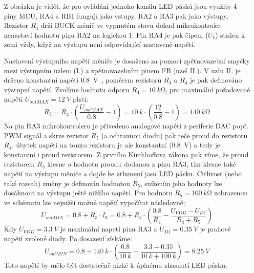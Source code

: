     Z obrázku je vidět, že pro ovládání jednoho kanálu LED pásků jsou využity 4 piny MCU, RA4 a RB1 fungují jako vstupy, RA2 a RA3 pak jako výstupy. Rezistor \(R_{1}\) drží BUCK měnič ve vypnutém stavu dokud mikrokontroler nenastaví hodnotu pinu RA2 na logickou 1. Pin RA4 je pak čipem (\(U_{1} \)) stažen k zemi vždy, když na výstupu není odpovídající nastavené napětí.  
    
    Nastavení výstupního napětí měniče je dosaženo za pomoci zpětnovazební smyčky mezi výstupním uzlem (I.) a zpětnovazebním pinem FB (uzel II.). V uzlu II. je drženo konstantní napětí \qty{0.8}{V}~\cite{Diodes_AP63356Q}, poměrem rezistorů \(R_{3} \) a \(R_{4} \) je pak definováno výstupní napětí. Zvolíme hodnotu odporu \(R_{4} = \qty{10}{k\ohm}\), pro maximální požadované napětí \(U_{outMAX} = \qty{12}{V}\) platí:
    \begin{equation}
        R_{3} = R_{4}\cdot \left(\frac{U_{outMAX} }{\num{0.8}}-1\right) = \qty{10}{k}\cdot \left(\frac{12}{\num{0.8}}-1\right) = \qty{140}{k\ohm}
    \end{equation} 
    Na pin RA3 mikrokontroleru je přivedeno analogové napětí z periferie DAC popř. PWM signál a skrze rezistor \(R_{5} \) (a ochrannou diodu) pak teče proud do rezistoru \(R_{4} \), úbytek napětí na tomto rezistoru je ale konstantní (\qty{0.8}{V}) a tedy je konstantní i proud rezistorem. Z prvního Kirchhoffova zákona pak víme, že proud rezistorem \(R_{3} \) klesne o hodnotu proudu dodanou z pinu RA3, tím klesne také napětí na výstupu měniče a dojde ke ztlumení jasu LED pásku. Citlivost (nebo také rozsah) změny je definován hodnotou \(R_{5} \), snížením jeho hodnoty lze dosáhnout na výstupu ještě nižšího napětí. Pro hodnotu \(R_{5} = \qty{100}{k\ohm}\) zobrazenou ve schématu lze nejnižší možné napětí vypočítat následovně:
    \begin{equation}
        U_{outMIN} = \num{0.8}+R_{3} \cdot I_{3} = \num{0.8}+R_{3} \cdot \left(\frac{\num{0.8}}{R_{4}} - \frac{U_{VDD} - U_{D1}}{R_{4}+R_{5}} \right) 
    \end{equation}  
    Kdy \(U_{VDD} = \qty{3.3}{V}\) je maximální napetí pinu RA3 a \(U_{D1}=\qty{0.35}{V} \) je prahové napětí zvolené diody. Po dosazení získáme:
    \begin{equation}
        U_{outMIN} = \num{0.8}+\qty{140}{k} \cdot \left(\frac{\num{0.8}}{\qty{10}{k}} - \frac{\num{3.3} - \num{0.35}}{\qty{10}{k}+\qty{100}{k}} \right) = \qty{8.25}{V}
    \end{equation}  
    Toto napětí by mělo být dostatečně nízké k úplnému zhasnutí LED pásku.

